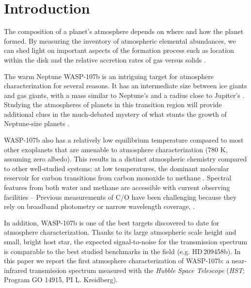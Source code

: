 \documentclass[twocolumn, trackchanges]{aastex61}
\begin{document}



\section{Introduction} \label{sec:intro}
The composition of a planet's atmosphere depends on where and how the planet formed. By measuring the inventory of atmospheric elemental abundances, we can shed light on important aspects of the formation process such as location within the disk and the relative accretion rates of gas versus solids \citep[][]{oberg11, fortney13, madhusudhan14,  mordasini16, espinoza17}.  

The warm Neptune WASP-107b is an intriguing target for atmosphere characterization for several reasons.  It has an intermediate size between ice giants and gas giants, with a mass similar to Neptune's and a radius close to Jupiter's \citep[$0.12\,M_\mathrm{Jup}$, $0.94\,R_\mathrm{Jup}$;][]{anderson17}. Studying the atmospheres of planets in this transition region will provide additional clues in the much-debated mystery of what stunts the growth of Neptune-size planets \citep[e.g][]{pollack96, dawson16, frelikh17}.  

WASP-107b also has a relatively low equilibrium temperature compared to most other exoplanets that are amenable to atmosphere characterization (780 K, assuming zero albedo).  This results in a distinct atmospheric chemistry compared to other well-studied systems: at low temperatures, the dominant molecular reservoir for carbon transitions from carbon monoxide to methane \citep{moses13}.  Spectral features from both water and methane are accessible with current observing facilities --  Previous measurements of C/O have been challenging because they rely on broadband photometry or narrow wavelength coverage,  \citep[e.g.][]{madhusudhan11, line14, benneke15, kreidberg15b}. 

In addition, WASP-107b is one of the best targets discovered to date for atmosphere characterization. Thanks to its large atmospheric scale height and small, bright host star, the expected signal-to-noise for the transmission spectrum is comparable to the best studied benchmarks in the field (e.g. HD\,209458b).  In this paper we report the first atmosphere characterization of WASP-107b: a near-infrared transmission spectrum measured with the \emph{Hubble Space Telescope} (\emph{HST}; Program GO 14915, PI L. Kreidberg).
\end{document}
